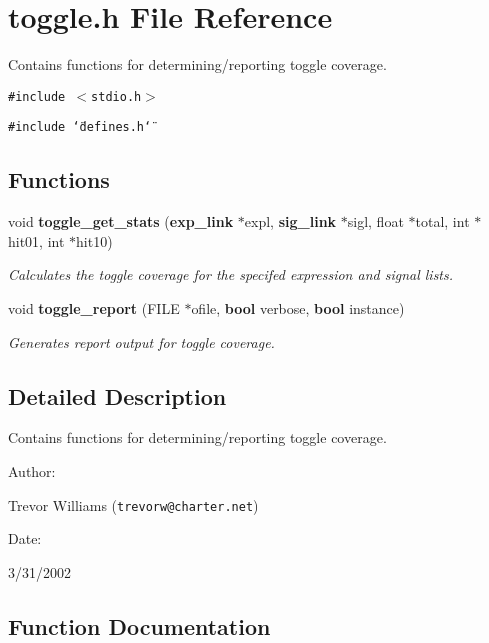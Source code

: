 \section{toggle.h File Reference}
\label{toggle_8h}
Contains functions for determining/reporting toggle coverage. 


{\tt \#include $<$stdio.h$>$}\par
{\tt \#include \char`\"{}defines.h\char`\"{}}\par
\subsection*{Functions}
\begin{CompactItemize}
\item 
void {\bf toggle\_\-get\_\-stats} ({\bf exp\_\-link} $\ast$expl, {\bf sig\_\-link} $\ast$sigl, float $\ast$total, int $\ast$hit01, int $\ast$hit10)
\begin{CompactList}\small\item\em Calculates the toggle coverage for the specifed expression and signal lists.\item\end{CompactList}\item 
void {\bf toggle\_\-report} (FILE $\ast$ofile, {\bf bool} verbose, {\bf bool} instance)
\begin{CompactList}\small\item\em Generates report output for toggle coverage.\item\end{CompactList}\end{CompactItemize}


\subsection{Detailed Description}
Contains functions for determining/reporting toggle coverage.



\begin{Desc}
\item[Author: ]\par
Trevor Williams ({\tt trevorw@charter.net}) \end{Desc}
\begin{Desc}
\item[Date: ]\par
3/31/2002\end{Desc}


\subsection{Function Documentation}
